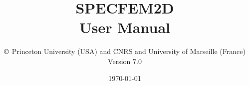 \documentclass[oneside,english,onecolumn,letterpaper]{book}
\begin{document}
\thispagestyle{empty}
\vspace*{\fill}
\begingroup
\centering
{}
\endgroup
\vspace*{\fill}
\restoregeometry

\title{\textbf{SPECFEM2D}\\
\textbf{User Manual}}

\author{$\copyright$ Princeton University (USA) and CNRS and University of Marseille (France)\\
Version 7.0
}

\date{\noindent \today}

\maketitle
\end{document}
